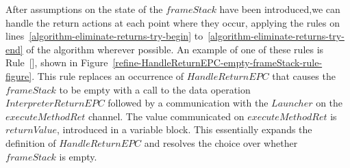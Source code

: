 
After assumptions on the state of the $frameStack$ have been
introduced,we can handle the return actions at each point where they
occur, applying the rules on
lines~\ref{algorithm-eliminate-returns-try-begin}
to~\ref{algorithm-eliminate-returns-try-end} of the algorithm wherever
possible.
An example of one of these rules is
Rule~[], shown
in Figure~\ref{refine-HandleReturnEPC-empty-frameStack-rule-figure}.
This rule replaces an occurrence of $HandleReturnEPC$ that causes the
$frameStack$ to be empty with a call to the data operation
$InterpreterReturnEPC$ followed by a communication with the $Launcher$
on the $executeMethodRet$ channel.
The value communicated on $executeMethodRet$ is $returnValue$,
introduced in a variable block.
This essentially expands the definition of $HandleReturnEPC$ and
resolves the choice over whether $frameStack$ is empty.

